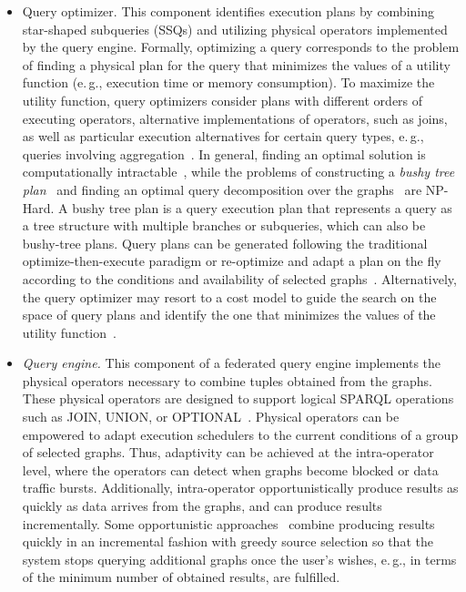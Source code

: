 \documentclass[a4paper,USenglish]{tgdk-v2021}
\begin{document}
\begin{itemize}
  \item Query optimizer.
    This component identifies execution plans by combining star-shaped subqueries (SSQs) and utilizing physical operators implemented by the query engine.
    Formally, optimizing a query corresponds to the problem of finding a physical plan for the query that minimizes the values of a utility function (e.\,g., execution time or memory consumption). 
    To maximize the utility function, query optimizers consider plans with different orders of executing operators, alternative implementations of operators, such as joins, as well as particular execution alternatives for certain query types, e.\,g., queries involving aggregation~\cite{DBLP:conf/esws/IbragimovHPZ15}.
    In general, finding an optimal solution is computationally intractable~\cite{DBLP:journals/tods/IbarakiK84}, while the problems of constructing a \emph{bushy tree plan}~\cite{DBLP:conf/pods/ScheufeleM97} and finding an optimal query decomposition over the graphs~\cite{DBLP:journals/tlsdkcs/VidalCAMP16} are NP-Hard. 
    A bushy tree plan is a query execution plan that represents a query as a tree structure with multiple branches or subqueries, which can also be bushy-tree plans.
    Query plans can be generated following the traditional optimize-then-execute paradigm or re-optimize and adapt a plan on the fly according to the conditions and availability of selected graphs~\cite{DBLP:series/lncs/EndrisVG20}. 
    Alternatively, the query optimizer may resort to a cost model to guide the search on the space of query plans and identify the one that minimizes the values of the utility function~\cite{DBLP:conf/semweb/MontoyaSH17}.
  \item \emph{Query engine.}
    This component of a federated query engine implements the physical operators necessary to combine tuples obtained from the graphs.
    These physical operators are designed to support logical SPARQL operations such as JOIN, UNION, or OPTIONAL~\cite{DBLP:journals/tods/PerezAG09}.
    Physical operators can be empowered to adapt execution schedulers to the current conditions of a group of selected graphs. 
    Thus, adaptivity can be achieved at the intra-operator level, where the operators can detect when graphs become blocked or data traffic bursts.
    Additionally, intra-operator opportunistically produce results as quickly as data arrives from the graphs, and can produce results incrementally. 
    Some opportunistic approaches~\cite{DBLP:conf/semweb/AcostaVLCR11,DBLP:conf/sigmod/HoseS12,DBLP:conf/i-semantics/GalkinEACVA17,DBLP:conf/semweb/AcostaV15} combine producing results quickly in an incremental fashion with greedy source selection so that the system stops querying additional graphs once the user's wishes, e.\,g., in terms of the minimum number of obtained results, are fulfilled. 

\end{itemize}
\end{document}
